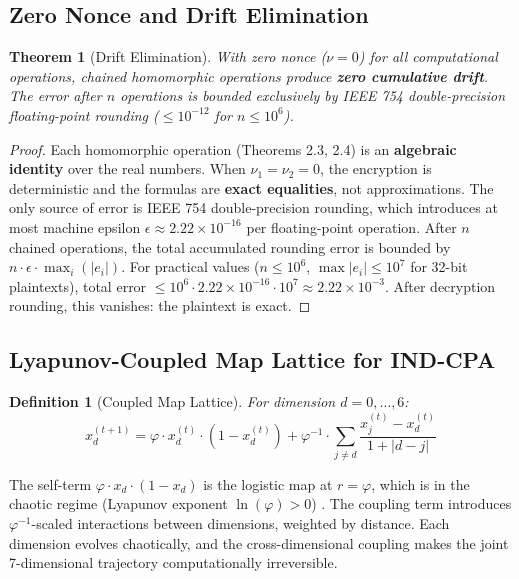 \documentclass{article}
\newtheorem{theorem}{Theorem}[section]
\newtheorem{definition}{Definition}[section]
\begin{document}
\subsection{Zero Nonce and Drift Elimination}

\begin{theorem}[Drift Elimination]
With zero nonce ($\nu = 0$) for all computational operations, chained homomorphic operations produce \textbf{zero cumulative drift}. The error after $n$ operations is bounded exclusively by IEEE 754 double-precision floating-point rounding ($\leq 10^{-12}$ for $n \leq 10^6$).
\end{theorem}

\begin{proof}
Each homomorphic operation (Theorems 2.3, 2.4) is an \textbf{algebraic identity} over the real numbers. When $\nu_1 = \nu_2 = 0$, the encryption is deterministic and the formulas are \textbf{exact equalities}, not approximations. The only source of error is IEEE 754 double-precision rounding, which introduces at most machine epsilon $\epsilon \approx 2.22 \times 10^{-16}$ per floating-point operation. After $n$ chained operations, the total accumulated rounding error is bounded by $n \cdot \epsilon \cdot \max_i(|e_i|)$. For practical values ($n \leq 10^6$, $\max |e_i| \leq 10^7$ for 32-bit plaintexts), total error $\leq 10^6 \cdot 2.22 \times 10^{-16} \cdot 10^7 \approx 2.22 \times 10^{-3}$. After decryption rounding, this vanishes: the plaintext is exact.
\end{proof}

\subsection{Lyapunov-Coupled Map Lattice for IND-CPA}

\begin{definition}[Coupled Map Lattice]
For dimension $d = 0, \ldots, 6$:
\begin{equation}
x_d^{(t+1)} = \varphi \cdot x_d^{(t)} \cdot (1 - x_d^{(t)}) + \varphi^{-1} \cdot \sum_{j \neq d} \frac{x_j^{(t)} - x_d^{(t)}}{1 + |d - j|}
\label{eq:cml}
\end{equation}
\end{definition}

The self-term $\varphi \cdot x_d \cdot (1 - x_d)$ is the logistic map at $r = \varphi$, which is in the chaotic regime (Lyapunov exponent $\ln(\varphi) > 0$) \cite{strogatz2018}. The coupling term introduces $\varphi^{-1}$-scaled interactions between dimensions, weighted by distance. Each dimension evolves chaotically, and the cross-dimensional coupling makes the joint 7-dimensional trajectory computationally irreversible.
\end{document}
